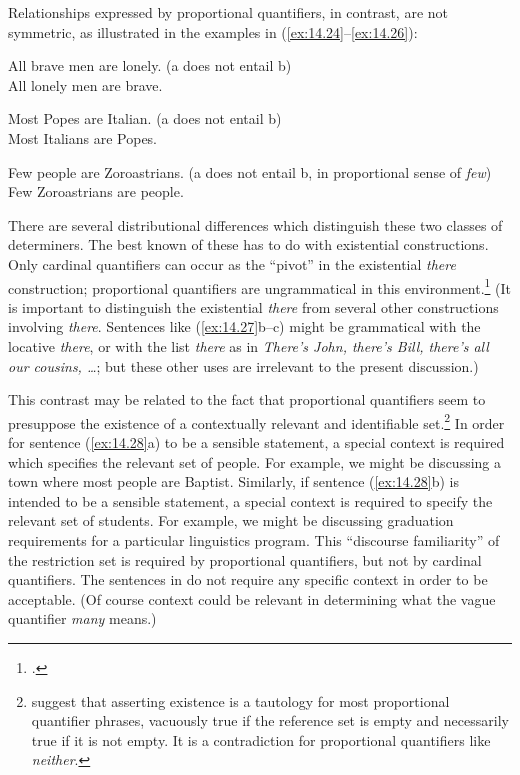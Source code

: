 Relationships expressed by proportional quantifiers, in contrast, are not symmetric, as illustrated in the examples in (\ref{ex:14.24}--\ref{ex:14.26}):


\ea \label{ex:14.24}
\ea All brave men are lonely. \hfill  (a does not entail b)\\
\ex All lonely men are brave.
                       \z
\z

\ea \label{ex:14.25}
\ea  Most Popes are Italian.  \hfill  (a does not entail b)\\
\ex Most Italians are Popes.
\z \z

\ea \label{ex:14.26}
\ea Few people are Zoroastrians.  \hfill (a does not entail b, in proportional sense of \textit{few})\\
\ex Few Zoroastrians are people.
                       \z
\z


There are several distributional differences which distinguish these two classes of determiners. The best known of these has to do with existential constructions. Only cardinal quantifiers can occur as the “pivot” in the existential \textit{there} construction; proportional quantifiers are ungrammatical in this environment.\footnote{\citet{Milsark1977}.} (It is important to distinguish the existential \textit{there} from several other constructions involving \textit{there}. Sentences like (\ref{ex:14.27}b--c) might be grammatical with the locative \textit{there}, or with the list \textit{there} as in \textit{There’s John, there’s Bill, there’s all our cousins, …}; but these other uses are irrelevant to the present discussion.)


\ea \label{ex:14.27}
\ea {}
                       \z
\z


This contrast may be related to the fact that proportional quantifiers seem to presuppose the existence of a contextually relevant and identifiable set.\footnote{\citet{BarwiseCooper1981} suggest that asserting existence is a tautology for most proportional quantifier phrases, vacuously true if the reference set is empty and necessarily true if it is not empty. It is a contradiction for proportional quantifiers like \textit{neither}.} In order for sentence (\ref{ex:14.28}a) to be a sensible statement, a special context is required which specifies the relevant set of people. For example, we might be discussing a town where most people are Baptist. Similarly, if sentence (\ref{ex:14.28}b) is intended to be a sensible statement, a special context is required to specify the relevant set of students. For example, we might be discussing graduation requirements for a particular linguistics program. This “discourse familiarity” of the restriction set is required by proportional quantifiers, but not by cardinal quantifiers. The sentences in  do not require any specific context in order to be acceptable. (Of course context could be relevant in determining what the vague quantifier \textit{many} means.)


